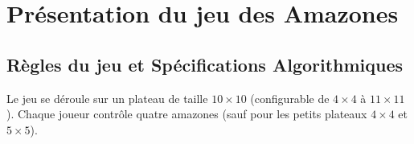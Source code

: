 \documentclass[a4paper]{article}
\begin{document}

\section{Présentation du jeu des Amazones}

\subsection{Règles du jeu et Spécifications Algorithmiques}

Le jeu se déroule sur un plateau de taille $10 \times 10$ (configurable de $4 \times 4$ à $11 \times 11$). Chaque joueur contrôle quatre amazones (sauf pour les petits plateaux $4 \times 4$ et $5 \times 5$).
\end{document}
